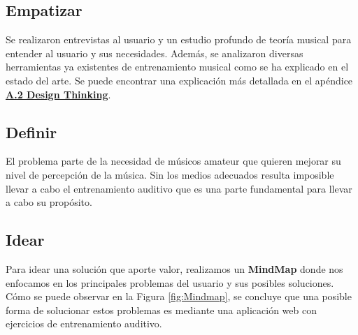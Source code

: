 \documentclass[12pt,twoside,titlepage]{report}
\begin{document}
\subsection{Empatizar}
\label{sec:empatizar}

Se realizaron entrevistas al usuario y un estudio profundo de teoría musical para entender al usuario y sus necesidades. Además, se analizaron diversas herramientas ya existentes de entrenamiento musical como se ha explicado en el estado del arte. Se puede encontrar una explicación más detallada en el apéndice \hyperref[sec:DesignThinking]{\textbf{A.2 Design Thinking}}.

\subsection{Definir}
\label{sec:definir}

El problema parte de la necesidad de músicos amateur que quieren mejorar su nivel de percepción de la música. Sin los medios adecuados resulta imposible llevar a cabo el entrenamiento auditivo que es una parte fundamental para llevar a cabo su propósito. 

\subsection{Idear}
\label{sec:idear}

Para idear una solución que aporte valor, realizamos un \textbf{MindMap} \cite{mindmap} donde nos enfocamos en los principales problemas del usuario y sus posibles soluciones.
Cómo se puede observar en la Figura \ref{fig:Mindmap}, se concluye que una posible forma de solucionar estos problemas es mediante una aplicación web con ejercicios de entrenamiento auditivo. 
\end{document}
